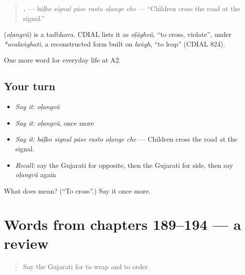 \begin{quote}
\textbf{     .} — \emph{bāḷko signal pāse rasto oḷange che} — \textquotedblleft{}Children cross the road at the signal.\textquotedblright{}
\end{quote}

\begin{cousinweb}
\textbf{} (\emph{oḷangvũ}) is a tadbhava. CDIAL lists it as \emph{oḷãghvũ}, \textquotedblleft{}to cross, violate\textquotedblright{}, under \emph{*avalaṅghati}, a reconstructed form built on \emph{laṅgh}, \textquotedblleft{}to leap\textquotedblright{} (CDIAL 824).
\end{cousinweb}

\begin{grammarlens}[title={What you've built}]
One more word for everyday life at A2.
\end{grammarlens}

\subsection*{Your turn}
\begin{itemize}
\raggedright
  \item \emph{Say it:} \emph{oḷangvũ}
  \item \emph{Say it:} \emph{oḷangvũ}, once more
  \item \emph{Say it:} \emph{bāḷko signal pāse rasto oḷange che} — Children cross the road at the signal.
  \item \emph{Recall:} say the Gujarati for opposite, then the Gujarati for side, then say \emph{oḷangvũ} again
\end{itemize}

\begin{tcolorbox}[breakable,colback=teal!4,colframe=teal!35!black,title={Before you move on}]
What does  mean? (\textquotedblleft{}To cross\textquotedblright{}.) Say it once more.
\end{tcolorbox}
\section[(dialogue)]{Words from chapters 189–194 — a review}

\label{lesson:GU-R194-review-189-194}



\begin{quote}
Say the Gujarati for to wrap and to order.
\end{quote}

